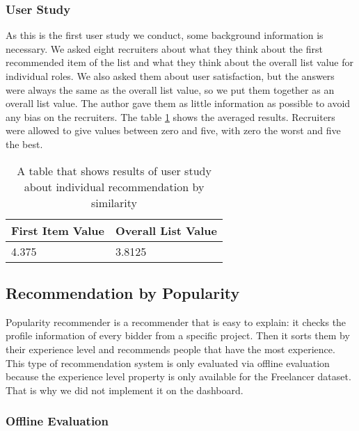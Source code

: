 \subsubsection{User Study}\label{subsubsection:user-study-first}

As this is the first user study we conduct, some background information is necessary. We asked eight recruiters about what they think about the first recommended item of the list and what they think about the overall list value for individual roles. We also asked them about user satisfaction, but the answers were always the same as the overall list value, so we put them together as an overall list value. The author gave them as little information as possible to avoid any bias on the recruiters. The table \ref{tab:user-study-individual-rec-similarity} shows the averaged results. Recruiters were allowed to give values between zero and five, with zero the worst and five the best.

\begin{table}[ht]
	\caption[User study individual similarity]{A table that shows results of user study about individual recommendation by similarity}\label{tab:user-study-individual-rec-similarity}
	\centering
	\begin{tabular}{l l}
		\toprule
		First Item Value & Overall List Value \\
		\midrule
		4.375 & 3.8125 \\
		\bottomrule
	\end{tabular}
\end{table}



\subsection{Recommendation by Popularity}\label{subsubsection:eval-popularity}

Popularity recommender is a recommender that is easy to explain: it checks the profile information of every bidder from a specific project. Then it sorts them by their experience level and recommends people that have the most experience. This type of recommendation system is only evaluated via offline evaluation because the experience level property is only available for the Freelancer dataset. That is why we did not implement it on the dashboard. 

\subsubsection{Offline Evaluation}


